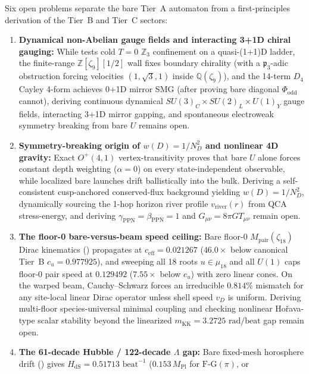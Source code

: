 Six open problems separate the bare Tier~A automaton from a first-principles derivation of the Tier~B and Tier~C
sectors:
\begin{enumerate}[itemsep=3pt]
\item \textbf{Dynamical non-Abelian gauge fields and interacting 3+1D chiral gauging:} While  tests
cold $T = 0$ $\mathbb{Z}_3$ confinement on a quasi-(1+1)D ladder, the finite-range $\mathbb{Z}[\zeta_9][1/2]$ wall
fixes boundary chirality (with a $\mathfrak{p}_3$-adic obstruction forcing velocities $(1, \sqrt{3}, 1)$ inside
$\mathbb{Q}(\zeta_9)$), and the 14-term $D_4$ Cayley 4-form achieves 0+1D mirror SMG (after proving bare diagonal
$\Phi_{\mathrm{odd}}$ cannot), deriving continuous dynamical $SU(3)_C \times SU(2)_L \times U(1)_Y$ gauge fields,
interacting 3+1D mirror gapping, and spontaneous electroweak symmetry breaking from bare $U$ remains open.
\item \textbf{Symmetry-breaking origin of $w(D) = 1/N_D^2$ and nonlinear 4D gravity:} Exact $O^+(4,1)$
vertex-transitivity proves that bare $U$ alone forces constant depth weighting ($\alpha = 0$) on every
state-independent observable, while localized bare launches drift ballistically into the bulk. Deriving a
self-consistent cusp-anchored conserved-flux background yielding $w(D) = 1/N_D^2$, dynamically sourcing the 1-hop
horizon river profile $v_{\mathrm{river}}(r)$ from QCA stress-energy, and deriving $\gamma_{\mathrm{PPN}} =
\beta_{\mathrm{PPN}} = 1$ and $G_{\mu\nu} = 8\pi G T_{\mu\nu}$ remain open.
\item \textbf{The floor-0 bare-versus-beam speed ceiling:} Bare floor-0 $M_{\mathrm{pair}}(\zeta_{18})$ Dirac
kinematics () propagates at $c_{\mathrm{eff}} = 0.021267$ ($46.0\times$ below canonical Tier~B
$c_u = 0.977925$), and sweeping all 18 roots $u \in \mu_{18}$ and all $U(1)$ caps floor-0 pair speed at $0.129492$
($7.55\times$ below $c_u$) with zero linear cones. On the warped beam, Cauchy--Schwarz forces an irreducible $0.814\%$
mismatch for any site-local linear Dirac operator unless shell speed $v_D$ is uniform. Deriving multi-floor
species-universal minimal coupling and checking nonlinear Ho\v{r}ava-type scalar stability beyond the linearized
$m_{\mathrm{KK}} = 3.2725\text{ rad/beat}$ gap remain open.
\item \textbf{The 61-decade Hubble / 122-decade $\Lambda$ gap:} Bare fixed-mesh horosphere drift ()
gives $H_{\mathrm{dS}} = 0.51713\text{ beat}^{-1}$ ($0.153\, M_{\mathrm{Pl}}$ for $\mathrm{F\text{-}G}(\pi)$, or

\end{enumerate}

